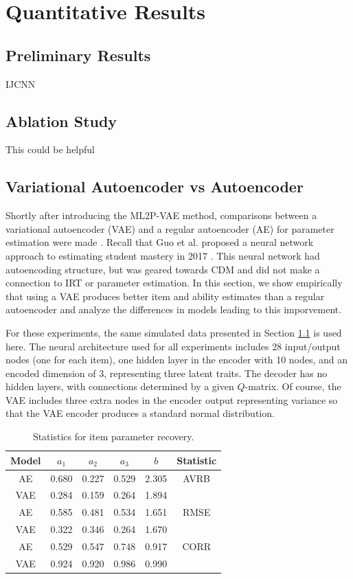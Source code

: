 \section{Quantitative Results}

\subsection{Preliminary Results}\label{sec:prelim}
IJCNN

\subsection{Ablation Study}
This could be helpful

\subsection{Variational Autoencoder vs Autoencoder}
Shortly after introducing the ML2P-VAE method, comparisons between a variational autoencoder (VAE) and a regular autoencoder (AE) for parameter estimation were made \cite{aied_paper}. Recall that Guo et al. proposed a neural network approach to estimating student mastery in 2017 \cite{guo2017}. This neural network had autoencoding structure, but was geared towards CDM and did not make a connection to IRT or parameter estimation. In this section, we show empirically that using a VAE produces better item and ability estimates than a regular autoencoder and analyze the differences in models leading to this imporvement.

For these experiments, the same simulated data presented in Section \ref{sec:prelim} is used here. The neural architecture used for all experiments includes 28 input/output nodes (one for each item), one hidden layer in the encoder with 10 nodes, and an encoded dimension of 3, representing three latent traits. The decoder has no hidden layers, with connections determined by a given $Q$-matrix. Of course, the VAE includes three extra nodes in the encoder output representing variance so that the VAE encoder produces a standard normal distribution.

\begin{table}[h]
\centering
\begin{tabular}{cccccc}
\hline
Model   & $a_1$ & $a_2$ & $a_3$ & $b$ & Statistic \\
\hline
AE & 0.680 & 0.227 & 0.529 & 2.305 & AVRB \\
VAE   &0.284  & 0.159 & 0.264 & 1.894 &  \\
\hline
AE & 0.585 & 0.481 & 0.534 & 1.651 & RMSE \\
VAE   & 0.322 & 0.346 & 0.264 & 1.670 & \\
\hline
AE & 0.529 & 0.547 & 0.748 & 0.917 & CORR \\
VAE   & 0.924 & 0.920 & 0.986 & 0.990 & \\
\hline
\end{tabular}
\caption{Statistics for item parameter recovery.}
\label{tab:vae_vs_ae_items}
\end{table}

